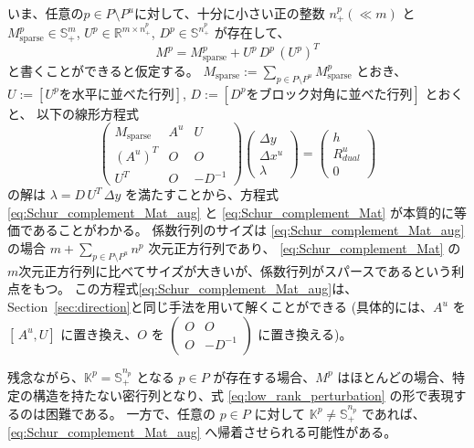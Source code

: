 \documentclass{jsarticle}
\begin{document}
いま、任意の$p\in P\setminus P^u$に対して、十分に小さい正の整数 $n^p_+(\ll m)$ と
$M^p_{\mathrm{sparse}} \in \mathbb{S}^m_+$, $U^p \in \mathbb{R}^{m\times n^p_+}$, $D^p\in \mathbb{S}^{n^p_+}$ が存在して、
\begin{equation}
  M^p = M^p_{\mathrm{sparse}} + U^p\, D^p\, (U^p)^T
  \label{eq:low_rank_perturbation}
\end{equation}
と書くことができると仮定する。
$M_{\mathrm{sparse}} := \sum_{p\in P\setminus P^u} M^p_{\mathrm{sparse}}$ とおき、
$U := [U^p \text{を水平に並べた行列}]$, 
$D:=[D^p\text{をブロック対角に並べた行列}]$ とおくと、
以下の線形方程式
\begin{equation}
  \begin{pmatrix}
    M_{\mathrm{sparse}} & A^u & U \\
    (A^u)^T & O & O \\
    U^T & O & -D^{-1}
  \end{pmatrix}
  \begin{pmatrix}
    \Delta y \\
    \Delta x^u \\
    \lambda
  \end{pmatrix}
  =
  \begin{pmatrix}
    h \\
    R^u_{dual} \\
    0
  \end{pmatrix}
  \label{eq:Schur_complement_Mat_aug}
\end{equation}
の解は $\lambda = D\,U^T\,\Delta y$ を満たすことから、方程式 \eqref{eq:Schur_complement_Mat_aug} と \eqref{eq:Schur_complement_Mat} が本質的に等価であることがわかる。
係数行列のサイズは \eqref{eq:Schur_complement_Mat_aug} の場合 $m+\sum_{p\in P\setminus P^u} n^p$ 次元正方行列であり、 \eqref{eq:Schur_complement_Mat} の $m$次元正方行列に比べてサイズが大きいが、係数行列がスパースであるという利点をもつ。
この方程式\eqref{eq:Schur_complement_Mat_aug}は、Section~\ref{sec:direction}と同じ手法を用いて解くことができる
(具体的には、$A^u$ を $[\,A^u, U]$ に置き換え、$O$ を $\begin{pmatrix} O & O \\ O & -D^{-1} \end{pmatrix}$ に置き換える)。

\medskip

残念ながら、$\mathbb{K}^p = \mathbb{S}^{n_p}_+$ となる $p \in P$ が存在する場合、$M^p$ はほとんどの場合、特定の構造を持たない密行列となり、式 \eqref{eq:low_rank_perturbation} の形で表現するのは困難である。
一方で、任意の $p\in P$ に対して $\mathbb{K}^p \neq \mathbb{S}^{n_p}_+$ であれば、
\eqref{eq:Schur_complement_Mat_aug} へ帰着させられる可能性がある。
\end{document}
